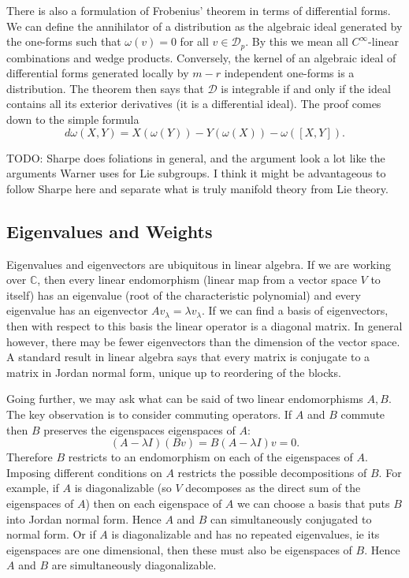 \documentclass[twoside,11pt,a4paper,leqno]{article}
\numberwithin{equation}{section}
\theoremstyle{plain}
\theoremstyle{definition}
\newcommand{\bbC}{\mathbb{C}}
\begin{document}
There is also a formulation of Frobenius' theorem in terms of differential forms.
We can define the annihilator of a distribution as the algebraic ideal generated by the one-forms such that $\omega(v) = 0$ for all $v \in \mathcal{D}_p$.
By this we mean all $C^\infty$-linear combinations and wedge products.
Conversely, the kernel of an algebraic ideal of differential forms generated locally by $m-r$ independent one-forms is a distribution.
The theorem then says that $\mathcal{D}$ is integrable if and only if the ideal contains all its exterior derivatives (it is a differential ideal).
The proof comes down to the simple formula
\[
d\omega(X,Y) = X(\omega(Y)) - Y(\omega(X)) - \omega([X,Y]).
\]

TODO: Sharpe does foliations in general, and the argument look a lot like the arguments Warner uses for Lie subgroups.
I think it might be advantageous to follow Sharpe here and separate what is truly manifold theory from Lie theory.



\subsection{Eigenvalues and Weights}

Eigenvalues and eigenvectors are ubiquitous in linear algebra.
If we are working over $\bbC$, then every linear endomorphism (linear map from a vector space $V$ to itself) has an eigenvalue (root of the characteristic polynomial) and every eigenvalue has an eigenvector $Av_\lambda = \lambda v_\lambda$.
If we can find a basis of eigenvectors, then with respect to this basis the linear operator is a diagonal matrix.
In general however, there may be fewer eigenvectors than the dimension of the vector space.
A standard result in linear algebra says that every matrix is conjugate to a matrix in Jordan normal form, unique up to reordering of the blocks.

Going further, we may ask what can be said of two linear endomorphisms $A,B$.
The key observation is to consider commuting operators.
If $A$ and $B$ commute then $B$ preserves the eigenspaces  eigenspaces of $A$:
\[
(A- \lambda I) (Bv) 
= B(A- \lambda I) v
= 0.
\]
Therefore $B$ restricts to an endomorphism on each of the eigenspaces of $A$.
Imposing different conditions on $A$ restricts the possible decompositions of $B$.
For example, if $A$ is diagonalizable (so $V$ decomposes as the direct sum of the eigenspaces of $A$) then on each eigenspace of $A$ we can choose a basis that puts $B$ into Jordan normal form.
Hence $A$ and $B$ can simultaneously conjugated to normal form.
Or if $A$ is diagonalizable and has no repeated eigenvalues, ie its eigenspaces are one dimensional, then these must also be eigenspaces of $B$.
Hence $A$ and $B$ are simultaneously diagonalizable.
\end{document}
